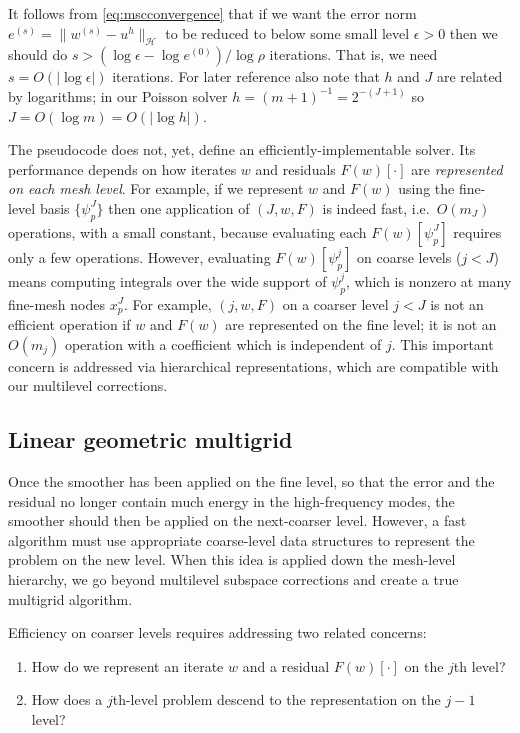 \documentclass[letterpaper,final,12pt,reqno]{amsart}
\theoremstyle{claim}
\newcommand{\eps}{\epsilon}
\numberwithin{equation}{section}
\numberwithin{figure}{section}
\numberwithin{table}{section}
\numberwithin{theorem}{section}
\begin{document}
It follows from \eqref{eq:mscconvergence} that if we want the error norm $e^{(s)} = \|w^{(s)}-u^h\|_{\mathcal{H}}$ to be reduced to below some small level $\eps>0$ then we should do $s>(\log\eps - \log e^{(0)})/\log \rho$ iterations.  That is, we need $s=O(|\log\eps|)$ iterations.  For later reference also note that $h$ and $J$ are related by logarithms; in our Poisson solver $h=(m+1)^{-1}=2^{-(J+1)}$ so $J = O(\log m) = O(|\log h|)$.

The pseudocode  does not, yet, define an efficiently-implementable solver.  Its performance depends on how iterates $w$ and residuals $F(w)[\cdot]$ are \emph{represented on each mesh level}.  For example, if we represent $w$ and $F(w)$ using the fine-level basis $\{\psi_p^J\}$ then one application of $(J,w,F)$ is indeed fast, i.e.~$O(m_J)$ operations, with a small constant, because evaluating each $F(w)[\psi_p^J]$ requires only a few operations.  However, evaluating $F(w)[\psi_p^j]$ on coarse levels ($j<J$) means computing integrals over the wide support of $\psi_p^j$, which is nonzero at many fine-mesh nodes $x_p^J$.  For example, $(j,w,F)$ on a coarser level $j<J$ is not an efficient operation if $w$ and $F(w)$ are represented on the fine level; it is not an $O(m_j)$ operation with a coefficient which is independent of $j$.  This important concern is addressed via hierarchical representations, which are compatible with our multilevel corrections.

\subsection*{Linear geometric multigrid}  Once the smoother has been applied on the fine level, so that the error and the residual no longer contain much energy in the high-frequency modes, the smoother should then be applied on the next-coarser level.  However, a fast algorithm must use appropriate coarse-level data structures to represent the problem on the new level.  When this idea is applied down the mesh-level hierarchy, we go beyond multilevel subspace corrections and create a true multigrid algorithm.

Efficiency on coarser levels requires addressing two related concerns:
\renewcommand{\labelenumi}{\emph{\roman{enumi})}}
\begin{enumerate}
\item How do we represent an iterate $w$ and a residual $F(w)[\cdot]$ on the $j$th level?
\item How does a $j$th-level problem descend to the representation on the $j-1$ level?
\end{enumerate}
\end{document}
